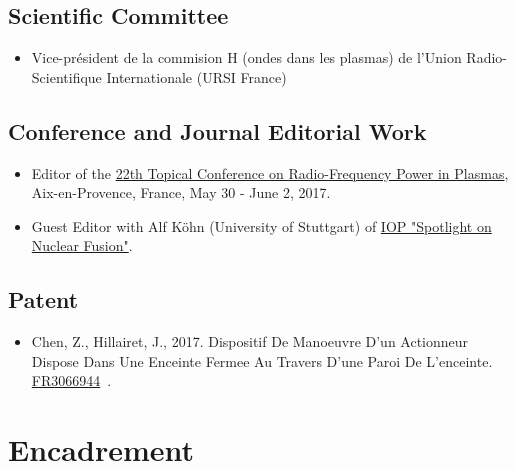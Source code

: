 \documentclass[
fontsize=10pt, %
twoside=true, %
numbers=noenddot, %
]{kaobook}
\begin{document}
	\section*{Scientific Committee}
	\begin{itemize}
		\item Vice-président de la commision H (ondes dans les plasmas) de l'Union Radio-Scientifique Internationale (URSI France)
	\end{itemize}
		


	\section*{Conference and Journal Editorial Work}
	\begin{itemize}
		\item Editor of the \href{https://www.epj-conferences.org/articles/epjconf/abs/2017/26/contents/contents.html}{22th Topical Conference on Radio-Frequency Power in Plasmas}, Aix-en-Provence, France, May 30 - June 2, 2017.
		\item Guest Editor with Alf Köhn (University of Stuttgart) of \href{https://iopscience.iop.org/journal/0031-9120/page/Spotlight-on-Nuclear-Fusion}{IOP "Spotlight on Nuclear Fusion"}.
	\end{itemize}
	
	\section*{Patent}

	\begin{itemize}
		\item Chen, Z., Hillairet, J., 2017. Dispositif De Manoeuvre D’un Actionneur Dispose Dans Une Enceinte Fermee Au Travers D’une Paroi De L’enceinte. \href{https://bases-brevets.inpi.fr/fr/document/FR3066944.html?s=1587045453863&p=5&cHash=9dd74066794d8b15bf32b0ef194d0d86}{FR3066944}~\cite{chen2017-4}.
	\end{itemize}
		
	
	\newpage
	\chapter{Encadrement}
\end{document}
